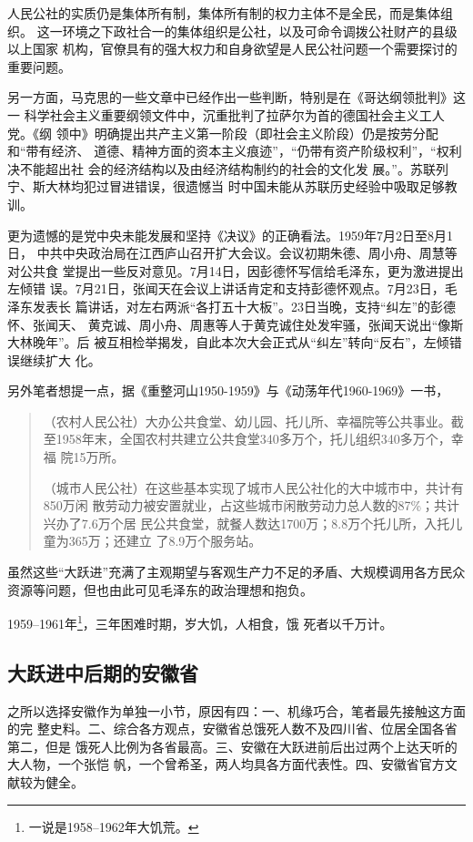 人民公社的实质仍是集体所有制，集体所有制的权力主体不是全民，而是集体组织。
这一环境之下政社合一的集体组织是公社，以及可命令调拨公社财产的县级以上国家
机构，官僚具有的强大权力和自身欲望是人民公社问题一个需要探讨的重要问题。

另一方面，马克思的一些文章中已经作出一些判断，特别是在《哥达纲领批判》这一
科学社会主义重要纲领文件中，沉重批判了拉萨尔为首的德国社会主义工人党。《纲
领中》明确提出共产主义第一阶段（即社会主义阶段）仍是按劳分配和“带有经济、
道德、精神方面的资本主义痕迹”，“仍带有资产阶级权利”，“权利决不能超出社
会的经济结构以及由经济结构制约的社会的文化发
展。”。\cite[435]{maenwen3}苏联列宁、斯大林均犯过冒进错误，很遗憾当
时中国未能从苏联历史经验中吸取足够教训。

更为遗憾的是党中央未能发展和坚持《决议》的正确看法。1959年7月2日至8月1日，
中共中央政治局在江西庐山召开扩大会议。会议初期朱德、周小舟、周慧等对公共食
堂提出一些反对意见。7月14日，因彭德怀写信给毛泽东，更为激进提出左倾错
误。7月21日，张闻天在会议上讲话肯定和支持彭德怀观点。7月23日，毛泽东发表长
篇讲话，对左右两派“各打五十大板”。23日当晚，支持“纠左”的彭德怀、张闻天、
黄克诚、周小舟、周惠等人于黄克诚住处发牢骚，张闻天说出“像斯大林晚年”。后
被互相检举揭发，自此本次大会正式从“纠左”转向“反右”，左倾错误继续扩大
化。

另外笔者想提一点，据《重整河山1950-1959》与《动荡年代1960-1969》一书，
\begin{quotation}
  （农村人民公社）大办公共食堂、幼儿园、托儿所、幸福院等公共事业。截
  至1958年末，全国农村共建立公共食堂340多万个，托儿组织340多万个，幸福
  院15万所。

  （城市人民公社）在这些基本实现了城市人民公社化的大中城市中，共计有850万闲
  散劳动力被安置就业，占这些城市闲散劳动力总人数的87\%；共计兴办了7.6万个居
  民公共食堂，就餐人数达1700万；8.8万个托儿所，入托儿童为365万；还建立
  了8.9万个服务站。
\end{quotation}
虽然这些“大跃进”充满了主观期望与客观生产力不足的矛盾、大规模调用各方民众
资源等问题，但也由此可见毛泽东的政治理想和抱负。

1959--1961年\footnote{一说是1958--1962年大饥荒。}，三年困难时期，岁大饥，人相食，饿
死者以千万计。

\subsection{大跃进中后期的安徽省}

之所以选择安徽作为单独一小节，原因有四：一、机缘巧合，笔者最先接触这方面的完
整史料。二、综合各方观点，安徽省总饿死人数不及四川省、位居全国各省第二，但是
饿死人比例为各省最高。三、安徽在大跃进前后出过两个上达天听的大人物，一个张恺
帆，一个曾希圣，两人均具各方面代表性。四、安徽省官方文献较为健全。

